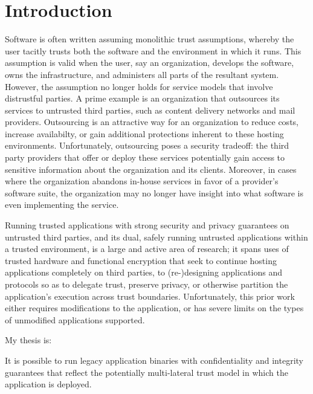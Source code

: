 \section{Introduction}
\label{sec:intro}

Software is often written assuming monolithic trust assumptions, whereby
the user tacitly trusts both the software and the environment in which it runs.
%
This assumption is valid when the user, say an organization, develops the
software, owns the infrastructure, and administers all parts of the resultant
system.
%
However, the assumption no longer holds for service models that involve
distrustful parties.
%
A prime example is an organization that outsources its services to untrusted
third parties, such as content delivery networks and mail providers.
%
Outsourcing is an attractive way for an organization to reduce costs,
increase availabilty, or gain additional protections inherent to these hosting
environments.
%
Unfortunately, outsourcing poses a security tradeoff: the third party
providers that offer or deploy these services potentially gain access to
sensitive information about the organization and its clients.   
%
Moreover, in cases where the organization abandons in-house services in favor
of a provider's software suite, the organization may no longer have insight
into what software is even implementing the service.


%
Running trusted applications with strong security and privacy guarantees on
untrusted third parties, and its dual, safely running untrusted applications
within a trusted environment, is a large and active area of research; it spans
uses of trusted hardware and functional encryption that seek to continue
hosting applications completely on third parties, to (re-)designing
applications and protocols so as to delegate trust, preserve privacy, or
otherwise partition the application's execution across trust boundaries.
%
Unfortunately, this prior work either requires modifications to the
application, or has severe limits on the types of unmodified applications
supported.


My thesis is:
\begin{displayquote}
    It is possible to run legacy application binaries with confidentiality and
    integrity guarantees that reflect the potentially multi-lateral trust model
    in which the application is deployed.
\end{displayquote}

